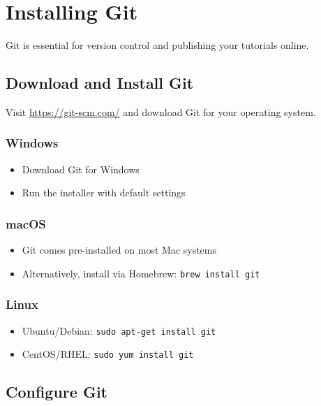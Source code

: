 \documentclass[
]{book}
\providecommand{\tightlist}{%
  \setlength{\itemsep}{0pt}\setlength{\parskip}{0pt}}
\begin{document}
\section{Installing Git}\label{installing-git}

Git is essential for version control and publishing your tutorials online.

\subsection{Download and Install Git}\label{download-and-install-git}

Visit \url{https://git-scm.com/} and download Git for your operating system.

\subsubsection{Windows}\label{windows}

\begin{itemize}
\tightlist
\item
  Download Git for Windows
\item
  Run the installer with default settings
\end{itemize}

\subsubsection{macOS}\label{macos}

\begin{itemize}
\tightlist
\item
  Git comes pre-installed on most Mac systems
\item
  Alternatively, install via Homebrew: \texttt{brew\ install\ git}
\end{itemize}

\subsubsection{Linux}\label{linux}

\begin{itemize}
\tightlist
\item
  Ubuntu/Debian: \texttt{sudo\ apt-get\ install\ git}
\item
  CentOS/RHEL: \texttt{sudo\ yum\ install\ git}
\end{itemize}

\subsection{Configure Git}\label{configure-git}
\end{document}
